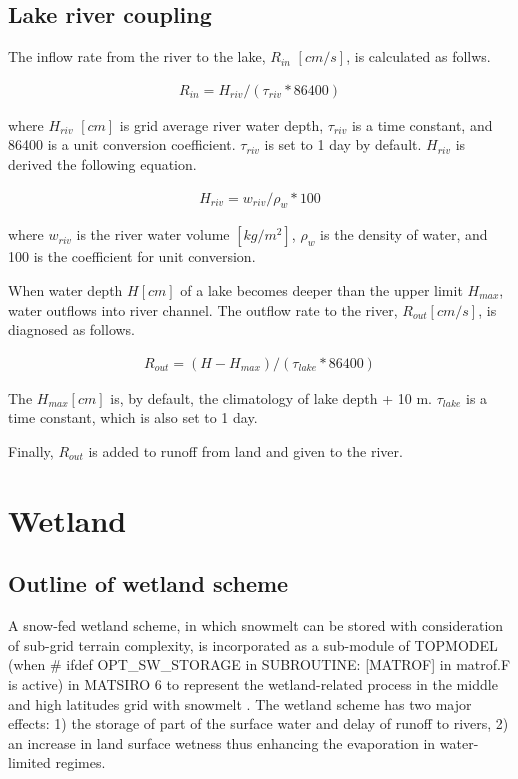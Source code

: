 \subsection{Lake river coupling}\label{lake-river-coupling}

The inflow rate from the river to the lake, \(R_{in}\) \([cm/s]\), is calculated as follws.

\begin{eqnarray}
    R_{in} = H_{riv} / (\tau_{riv} * 86400)
\end{eqnarray}

where \(H_{riv}\) \([cm]\) is grid average river water depth, \(\tau_{riv}\) is a time constant, and 86400 is a unit conversion coefficient. \(\tau_{riv}\) is set to 1 day by default. \(H_{riv}\) is
derived the following equation.

\begin{eqnarray}
    H_{riv} = w_{riv} / \rho_w * 100
\end{eqnarray}

where \(w_{riv}\) is the river water volume \([kg/m^2]\), \(\rho_w\) is the density of water, and 100 is the coefficient for unit conversion.

When water depth \(H [cm]\) of a lake becomes deeper than the upper limit \(H_{max}\), water outflows into river channel. The outflow rate to the river, \(R_{out} [cm/s]\), is diagnosed as follows.

\begin{eqnarray}
    R_{out} = (H - H_{max}) / ( \tau_{lake} * 86400 )
\end{eqnarray}

The \(H_{max} [cm]\) is, by default, the climatology of lake depth + 10 m. \(\tau_{lake}\) is a time constant, which is also set to 1 day.

Finally, \(R_{out}\) is added to runoff from land and given to the river.

\section{Wetland}\label{wetland}

\subsection{Outline of wetland scheme}\label{outline-of-wetland-scheme}

A snow-fed wetland scheme, in which snowmelt can be stored with consideration of sub-grid terrain complexity, is incorporated as a sub-module of TOPMODEL (when \# ifdef OPT\_SW\_STORAGE in SUBROUTINE:
{[}MATROF{]} in matrof.F is active) in MATSIRO 6 to represent the wetland-related process in the middle and high latitudes grid with snowmelt \citep[Fig. 12-1]{Nitta2015-ob, Nitta2017-hz}. The wetland
scheme has two major effects: 1) the storage of part of the surface water and delay of runoff to rivers, 2) an increase in land surface wetness thus enhancing the evaporation in water-limited regimes.

